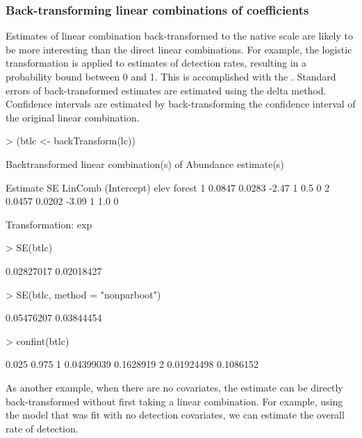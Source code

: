 \documentclass[article,shortnames]{jss}
\begin{document}
\subsubsection{Back-transforming linear combinations of coefficients}

Estimates of linear combination back-transformed to the native scale
are likely to be more interesting than the direct linear combinations.
For example, the logistic transformation is applied to estimates of
detection rates, resulting in a probability bound between 0 and
1. This is accomplished with the .  Standard
errors of back-transformed estimates are estimated using the delta
method.  Confidence intervals are estimated by back-transforming the
confidence interval of the original linear combination.

\begin{Schunk}
\begin{Sinput}
> (btlc <- backTransform(lc))
\end{Sinput}
\begin{Soutput}
Backtransformed linear combination(s) of Abundance estimate(s)

  Estimate     SE LinComb (Intercept) elev forest
1   0.0847 0.0283   -2.47           1  0.5      0
2   0.0457 0.0202   -3.09           1  1.0      0

Transformation: exp 
\end{Soutput}
\begin{Sinput}
> SE(btlc)
\end{Sinput}
\begin{Soutput}
[1] 0.02827017 0.02018427
\end{Soutput}
\begin{Sinput}
> SE(btlc, method = "nonparboot")
\end{Sinput}
\begin{Soutput}
[1] 0.05476207 0.03844454
\end{Soutput}
\begin{Sinput}
> confint(btlc)
\end{Sinput}
\begin{Soutput}
       0.025     0.975
1 0.04399039 0.1628919
2 0.01924498 0.1086152
\end{Soutput}
\end{Schunk}

As another example, when there are no covariates, the estimate can be
directly back-transformed without first taking a linear combination.
For example, using the model that was fit with no detection
covariates, we can estimate the overall rate of detection.
\end{document}
